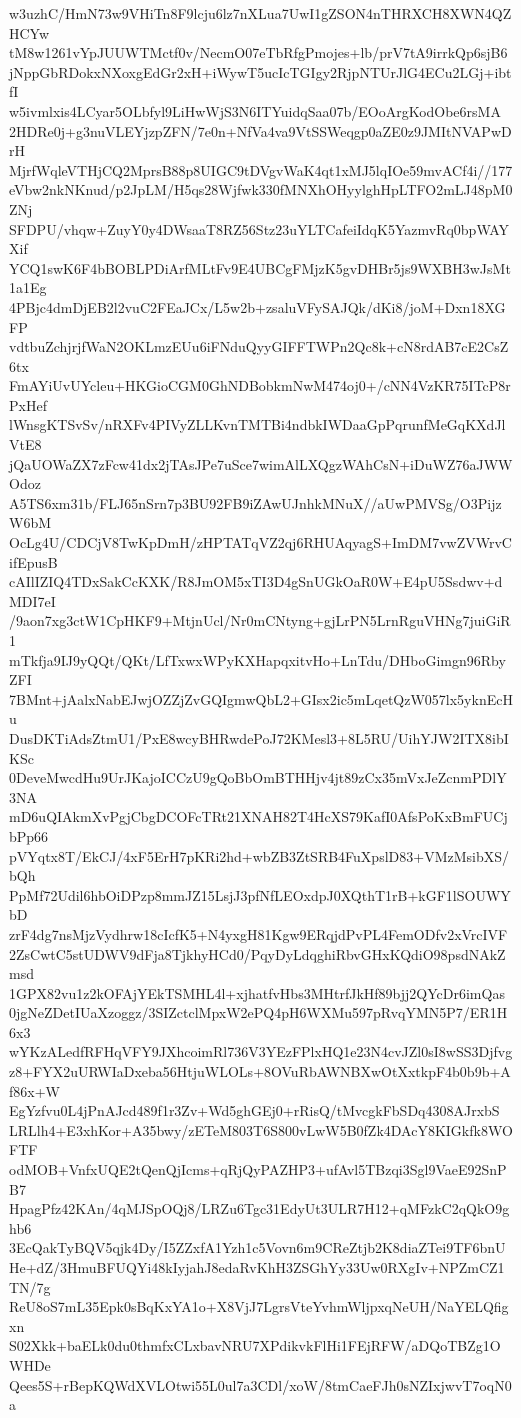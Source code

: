 w3uzhC/HmN73w9VHiTn8F9lcju6lz7nXLua7UwI1gZSON4nTHRXCH8XWN4QZHCYw
tM8w1261vYpJUUWTMctf0v/NecmO07eTbRfgPmojes+lb/prV7tA9irrkQp6sjB6
jNppGbRDokxNXoxgEdGr2xH+iWywT5ucIcTGIgy2RjpNTUrJlG4ECu2LGj+ibtfI
w5ivmlxis4LCyar5OLbfyl9LiHwWjS3N6ITYuidqSaa07b/EOoArgKodObe6rsMA
2HDRe0j+g3nuVLEYjzpZFN/7e0n+NfVa4va9VtSSWeqgp0aZE0z9JMItNVAPwDrH
MjrfWqleVTHjCQ2MprsB88p8UIGC9tDVgvWaK4qt1xMJ5lqIOe59mvACf4i//177
eVbw2nkNKnud/p2JpLM/H5qs28Wjfwk330fMNXhOHyylghHpLTFO2mLJ48pM0ZNj
SFDPU/vhqw+ZuyY0y4DWsaaT8RZ56Stz23uYLTCafeiIdqK5YazmvRq0bpWAYXif
YCQ1swK6F4bBOBLPDiArfMLtFv9E4UBCgFMjzK5gvDHBr5js9WXBH3wJsMt1a1Eg
4PBjc4dmDjEB2l2vuC2FEaJCx/L5w2b+zsaluVFySAJQk/dKi8/joM+Dxn18XGFP
vdtbuZchjrjfWaN2OKLmzEUu6iFNduQyyGIFFTWPn2Qc8k+cN8rdAB7cE2CsZ6tx
FmAYiUvUYcleu+HKGioCGM0GhNDBobkmNwM474oj0+/cNN4VzKR75ITcP8rPxHef
lWnsgKTSvSv/nRXFv4PIVyZLLKvnTMTBi4ndbkIWDaaGpPqrunfMeGqKXdJlVtE8
jQaUOWaZX7zFcw41dx2jTAsJPe7uSce7wimAlLXQgzWAhCsN+iDuWZ76aJWWOdoz
A5TS6xm31b/FLJ65nSrn7p3BU92FB9iZAwUJnhkMNuX//aUwPMVSg/O3PijzW6bM
OcLg4U/CDCjV8TwKpDmH/zHPTATqVZ2qj6RHUAqyagS+ImDM7vwZVWrvCifEpusB
cAIlIZIQ4TDxSakCcKXK/R8JmOM5xTI3D4gSnUGkOaR0W+E4pU5Ssdwv+dMDI7eI
/9aon7xg3ctW1CpHKF9+MtjnUcl/Nr0mCNtyng+gjLrPN5LrnRguVHNg7juiGiR1
mTkfja9IJ9yQQt/QKt/LfTxwxWPyKXHapqxitvHo+LnTdu/DHboGimgn96RbyZFI
7BMnt+jAalxNabEJwjOZZjZvGQIgmwQbL2+GIsx2ic5mLqetQzW057lx5yknEcHu
DusDKTiAdsZtmU1/PxE8wcyBHRwdePoJ72KMesl3+8L5RU/UihYJW2ITX8ibIKSc
0DeveMwcdHu9UrJKajoICCzU9gQoBbOmBTHHjv4jt89zCx35mVxJeZcnmPDlY3NA
mD6uQIAkmXvPgjCbgDCOFcTRt21XNAH82T4HcXS79KafI0AfsPoKxBmFUCjbPp66
pVYqtx8T/EkCJ/4xF5ErH7pKRi2hd+wbZB3ZtSRB4FuXpslD83+VMzMsibXS/bQh
PpMf72Udil6hbOiDPzp8mmJZ15LsjJ3pfNfLEOxdpJ0XQthT1rB+kGF1lSOUWYbD
zrF4dg7nsMjzVydhrw18cIcfK5+N4yxgH81Kgw9ERqjdPvPL4FemODfv2xVrcIVF
2ZsCwtC5stUDWV9dFja8TjkhyHCd0/PqyDyLdqghiRbvGHxKQdiO98psdNAkZmsd
1GPX82vu1z2kOFAjYEkTSMHL4l+xjhatfvHbs3MHtrfJkHf89bjj2QYcDr6imQas
0jgNeZDetIUaXzoggz/3SIZctclMpxW2ePQ4pH6WXMu597pRvqYMN5P7/ER1H6x3
wYKzALedfRFHqVFY9JXhcoimRl736V3YEzFPlxHQ1e23N4cvJZl0sI8wSS3Djfvg
z8+FYX2uURWIaDxeba56HtjuWLOLs+8OVuRbAWNBXwOtXxtkpF4b0b9b+Af86x+W
EgYzfvu0L4jPnAJcd489f1r3Zv+Wd5ghGEj0+rRisQ/tMvcgkFbSDq4308AJrxbS
LRLlh4+E3xhKor+A35bwy/zETeM803T6S800vLwW5B0fZk4DAcY8KIGkfk8WOFTF
odMOB+VnfxUQE2tQenQjIcms+qRjQyPAZHP3+ufAvl5TBzqi3Sgl9VaeE92SnPB7
HpagPfz42KAn/4qMJSpOQj8/LRZu6Tgc31EdyUt3ULR7H12+qMFzkC2qQkO9ghb6
3EcQakTyBQV5qjk4Dy/I5ZZxfA1Yzh1c5Vovn6m9CReZtjb2K8diaZTei9TF6bnU
He+dZ/3HmuBFUQYi48kIyjahJ8edaRvKhH3ZSGhYy33Uw0RXgIv+NPZmCZ1TN/7g
ReU8oS7mL35Epk0sBqKxYA1o+X8VjJ7LgrsVteYvhmWljpxqNeUH/NaYELQfigxn
S02Xkk+baELk0du0thmfxCLxbavNRU7XPdikvkFlHi1FEjRFW/aDQoTBZg1OWHDe
Qees5S+rBepKQWdXVLOtwi55L0ul7a3CDl/xoW/8tmCaeFJh0sNZIxjwvT7oqN0a
